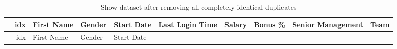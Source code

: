\documentclass [oneside,10pt,a4paper,ngerman,BCOR10mm,headsepline,parindent,final]{scrartcl}
\begin{document}
    \begin{longtable}[]{@{}rrllllrrll@{}}
\caption{Show dataset after removing all completely identical
duplicates}\tabularnewline
\toprule
\begin{minipage}[b]{0.03\columnwidth}\raggedleft
\strut
\end{minipage} & \begin{minipage}[b]{0.04\columnwidth}\raggedleft
idx\strut
\end{minipage} & \begin{minipage}[b]{0.08\columnwidth}\raggedright
First Name\strut
\end{minipage} & \begin{minipage}[b]{0.06\columnwidth}\raggedright
Gender\strut
\end{minipage} & \begin{minipage}[b]{0.08\columnwidth}\raggedright
Start Date\strut
\end{minipage} & \begin{minipage}[b]{0.10\columnwidth}\raggedright
Last Login Time\strut
\end{minipage} & \begin{minipage}[b]{0.05\columnwidth}\raggedleft
Salary\strut
\end{minipage} & \begin{minipage}[b]{0.06\columnwidth}\raggedleft
Bonus \%\strut
\end{minipage} & \begin{minipage}[b]{0.11\columnwidth}\raggedright
Senior Management\strut
\end{minipage} & \begin{minipage}[b]{0.12\columnwidth}\raggedright
Team\strut
\end{minipage}\tabularnewline
\midrule
\endfirsthead
\toprule
\begin{minipage}[b]{0.03\columnwidth}\raggedleft
\strut
\end{minipage} & \begin{minipage}[b]{0.04\columnwidth}\raggedleft
idx\strut
\end{minipage} & \begin{minipage}[b]{0.08\columnwidth}\raggedright
First Name\strut
\end{minipage} & \begin{minipage}[b]{0.06\columnwidth}\raggedright
Gender\strut
\end{minipage} & \begin{minipage}[b]{0.08\columnwidth}\raggedright
Start Date\strut
\end{minipage} & \begin{minipage}[b]{0.10\columnwidth}\raggedright

\end{minipage}
\end{longtable}
\end{document}
